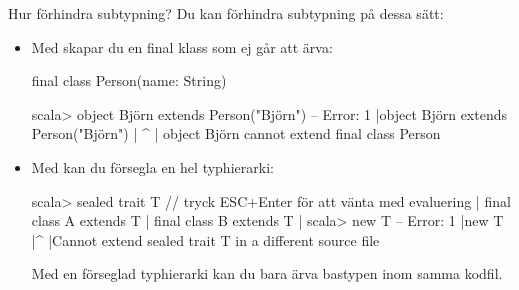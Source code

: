 \begin{Slide}{Hur förhindra subtypning?}
Du kan förhindra subtypning på dessa sätt:  
\begin{itemize}
\item Med  skapar du en final klass som ej går att ärva:
\begin{Code}
final class Person(name: String)
\end{Code}   
\begin{REPLsmall}
scala> object Björn extends Person("Björn")
-- Error:
1 |object Björn extends Person("Björn")
  |       ^
  |       object Björn cannot extend final class Person

\end{REPLsmall}
\item Med  kan du försegla en hel typhierarki:
\begin{REPLsmall}
scala> sealed trait T  // tryck ESC+Enter för att vänta med evaluering
     | final class A extends T
     | final class B extends T
     |
scala> new T{}
-- Error:
1 |new T{}
|^
|Cannot extend sealed trait T in a different source file
\end{REPLsmall}
Med en förseglad typhierarki kan du bara ärva bastypen inom samma kodfil. 
\end{itemize}
\end{Slide}


